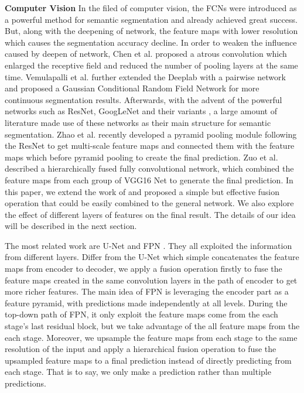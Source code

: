 \textbf{Computer Vision} In the filed of computer vision, the FCNs \cite{IEEEexample:Long_2015_CVPR} were introduced as a powerful method for semantic segmentation and already achieved great success.
 But, along with the deepening of network, the feature maps with lower resolution which causes the segmentation accuracy decline.
 In order to weaken the influence caused by deepen of network, Chen et al.\cite{IEEEexample:chen2016deeplab} proposed a atrous convolution which enlarged the receptive field and reduced the number of pooling layers at the same time.
 Vemulapalli et al.\cite{IEEEexample:vemulapalli2016gaussian} further extended the Deeplab \cite{IEEEexample:chen2016deeplab} with a pairwise network and proposed a Gaussian Conditional Random Field Network for more continuous segmentation results.
 Afterwards, with the advent of the powerful networks such as ResNet\cite{IEEEexample:he2016deep}, GoogLeNet\cite{IEEEexample:szegedy2015going} and their variants \cite{IEEEexample:szegedy2016rethinking}\cite{IEEEexample:szegedy2017inception}\cite{IEEEexample:xie2017aggregated}, a large amount of literature made use of these networks as their main structure for semantic segmentation.
 Zhao et al.\cite{IEEEexample:zhao2017contextually} recently developed a pyramid pooling module following the ResNet\cite{IEEEexample:he2016deep} to get multi-scale feature maps and connected them with the feature maps which before pyramid pooling to create the final prediction.
 Zuo et al.\cite{IEEEexample:zuo2016hf} described a hierarchically fused fully convolutional network, which combined the feature maps from each group of VGG16 Net to generate the final prediction.
 In this paper, we extend the work of\cite{IEEEexample:zuo2016hf} and proposed a simple but effective fusion operation that could be easily combined to the general network.
 We also explore the effect of different layers of features on the final result. The details of our idea will be described in the next section.


The most related work are U-Net\cite{IEEEexample:ronneberger2015u} and FPN \cite{IEEEexample:lin2017feature}. They all exploited the information from different layers. Differ from the U-Net which simple concatenates the feature maps from encoder to decoder, we apply a fusion operation firstly to fuse the feature maps created in the same convolution layers in the path of encoder to get more richer features. 
The main idea of FPN is leveraging the encoder part as a feature pyramid, with predictions made independently at all levels. During the top-down path of FPN, it only exploit the feature maps come from the each stage's last residual block, but we take advantage of the all feature maps from the each stage. Moreover, we upsample the feature maps from each stage to the same resolution of the input and apply a hierarchical fusion operation to fuse the upsampled feature maps to a final prediction instead of directly predicting from each stage. That is to say, we only make a prediction rather than multiple predictions.









